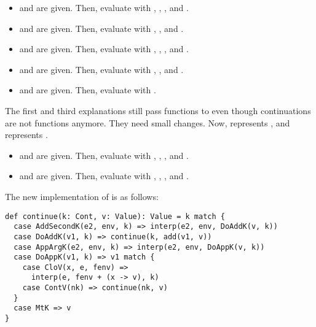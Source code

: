 \begin{itemize}
  \item {} and  are given. Then, evaluate  with , , ,
  and .
  \item {} and  are given. Then, evaluate  with , , and .
  \item {} and  are given. Then, evaluate  with , , , and
  .
  \item {} and  are given. Then, evaluate 
  with , , and .
  \item {} and  are given. Then, evaluate  with .
\end{itemize}

The first and third explanations still pass functions to  even
though continuations are not functions anymore. They need small changes. Now,
 represents , and
 represents .

\begin{itemize}
  \item {} and  are given. Then, evaluate  with , , , and .
  \item {} and  are given. Then, evaluate  with , , , and .
\end{itemize}

The new implementation of  is as follows:

\begin{verbatim}
def continue(k: Cont, v: Value): Value = k match {
  case AddSecondK(e2, env, k) => interp(e2, env, DoAddK(v, k))
  case DoAddK(v1, k) => continue(k, add(v1, v))
  case AppArgK(e2, env, k) => interp(e2, env, DoAppK(v, k))
  case DoAppK(v1, k) => v1 match {
    case CloV(x, e, fenv) =>
      interp(e, fenv + (x -> v), k)
    case ContV(nk) => continue(nk, v)
  }
  case MtK => v
}
\end{verbatim}

